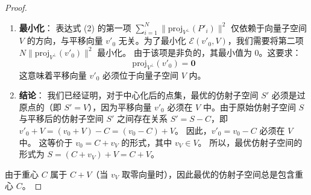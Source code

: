 \documentclass[lang=cn,newtx,10pt,scheme=chinese,chinesefont=nofont,citestyle=gb7714-2015, bibstyle=gb7714-2015]{elegantbook}
\begin{document}
\begin{refsection}
\begin{proof}
\begin{enumerate}
    \item \textbf{最小化}：
    表达式 (2) 的第一项 $\sum_{i=1}^{N} \| \text{proj}_{V^\perp}(P'_i) \|^2$ 仅依赖于向量子空间 $V$ 的方向，与平移向量 $v'_0$ 无关。为了最小化 $\mathcal{E}(v'_0, V)$，我们需要将第二项 $N \| \text{proj}_{V^\perp}(v'_0) \|^2$ 最小化。
    由于该项是非负的，其最小值为 $0$。这要求：
    \[
    \text{proj}_{V^\perp}(v'_0) = \mathbf{0}
    \]
    这意味着平移向量 $v'_0$ 必须位于向量子空间 $V$ 内。

    \item \textbf{结论}：
    我们已经证明，对于中心化后的点集，最优的仿射子空间 $S'$ 必须是过原点的（即 $S' = V$），因为平移向量 $v'_0$ 必须在 $V$ 中。由于原始仿射子空间 $S$ 与平移后的仿射子空间 $S'$ 之间存在关系 $S' = S - C$，即 $v'_0 + V = (v_0 + V) - C = (v_0 - C) + V$。
    因此，$v'_0 = v_0 - C$ 必须在 $V$ 中。
    这等价于 $v_0 = C + v_V$ 的形式，其中 $v_V \in V$。
    所以，最优仿射子空间的形式为 $S = (C + v_V) + V = C + V$。
\end{enumerate}

由于重心 $C$ 属于 $C+V$（当 $v_V$ 取零向量时），因此最优的仿射子空间总是包含重心 $C$。
\end{proof}



\end{refsection}
\end{document}
